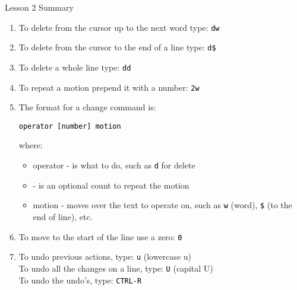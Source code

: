 \documentclass[handout, 10pt]{beamer}
\newcommand{\code}[2][black]{\textcolor{#1}{\colorbox{codegray}{\texttt{#2}}}}
\begin{document}
\begin{frame}{Lesson 2 Summary}
	\begin{enumerate}
		\item To delete from the cursor up to the next word type: \code{dw}

		\item To delete from the cursor to the end of a line type: \code{d\$}

		\item To delete a whole line type: \code{dd}

		\item To repeat a motion prepend it with a number: \code{2w}

		\item The format for a change command is: \\
		\begin{center}
			\code{operator  [number]  motion}
		\end{center}
		where:
		\begin{itemize}
			\item operator - is what to do, such as \code{d} for delete

			\item \text{[number]} - is an optional count to repeat the motion

			\item motion   - moves over the text to operate on, such as
				\code{w} (word), \code{\$} (to the end of line), etc.
		\end{itemize}

		\item To move to the start of the line use a zero: \code{0}

		\item To undo previous actions, type: \code{u} (lowercase u) \\
			To undo all the changes on a line, type: \code{U} (capital U) \\
			To undo the undo's, type: \code{CTRL-R}
	\end{enumerate}
\end{frame}
\end{document}
